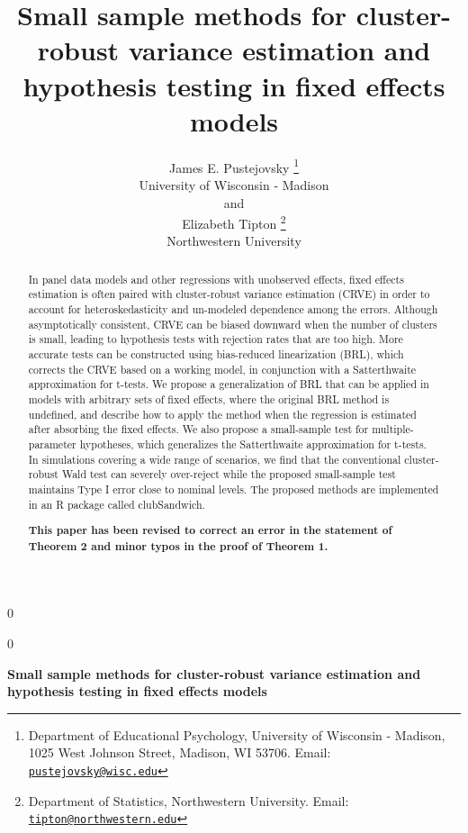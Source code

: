 \documentclass[12pt]{article}
\newcommand{\blind}{0}
\begin{document}
\def\spacingset#1{\renewcommand{\baselinestretch}%
{#1}\small\normalsize} \spacingset{1}



\blind
{
  \title{\bf Small sample methods for cluster-robust variance estimation
and hypothesis testing in fixed effects models}

  \author{
        James E. Pustejovsky \thanks{Department of Educational
Psychology, University of Wisconsin - Madison, 1025 West Johnson Street,
Madison, WI 53706. Email:
\href{mailto:pustejovsky@wisc.edu}{\nolinkurl{pustejovsky@wisc.edu}}} \\
    University of Wisconsin - Madison\\
     and \\     Elizabeth Tipton \thanks{Department of Statistics,
Northwestern University. Email:
\href{mailto:tipton@northwestern.edu}{\nolinkurl{tipton@northwestern.edu}}} \\
    Northwestern University\\
      }
  \maketitle
} \fi

\blind
{
  \bigskip
  \bigskip
  \bigskip
  \begin{center}
    {\LARGE\bf Small sample methods for cluster-robust variance
estimation and hypothesis testing in fixed effects models}
  \end{center}
  \medskip
} \fi

\bigskip
\begin{abstract}
In panel data models and other regressions with unobserved effects,
fixed effects estimation is often paired with cluster-robust variance
estimation (CRVE) in order to account for heteroskedasticity and
un-modeled dependence among the errors. Although asymptotically
consistent, CRVE can be biased downward when the number of clusters is
small, leading to hypothesis tests with rejection rates that are too
high. More accurate tests can be constructed using bias-reduced
linearization (BRL), which corrects the CRVE based on a working model,
in conjunction with a Satterthwaite approximation for t-tests. We
propose a generalization of BRL that can be applied in models with
arbitrary sets of fixed effects, where the original BRL method is
undefined, and describe how to apply the method when the regression is
estimated after absorbing the fixed effects. We also propose a
small-sample test for multiple-parameter hypotheses, which generalizes
the Satterthwaite approximation for t-tests. In simulations covering a
wide range of scenarios, we find that the conventional cluster-robust
Wald test can severely over-reject while the proposed small-sample test
maintains Type I error close to nominal levels. The proposed methods are
implemented in an R package called clubSandwich.

\textbf{This paper has been revised to correct an error in the statement
of Theorem 2 and minor typos in the proof of Theorem 1.}
\end{abstract}
\end{document}
